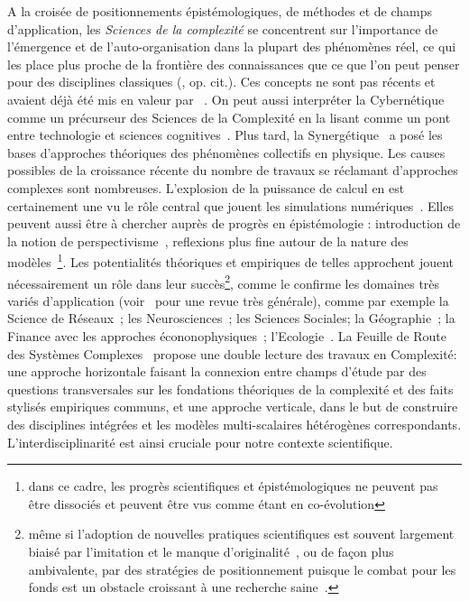 {}{
A la croisée de positionnements épistémologiques, de méthodes et de champs d'application, les \emph{Sciences de la complexité} se concentrent sur l'importance de l'émergence et de l'auto-organisation dans la plupart des phénomènes réel, ce qui les place plus proche de la frontière des connaissances que ce que l'on peut penser pour des disciplines classiques (, op. cit.). Ces concepts ne sont pas récents et avaient déjà été mis en valeur par ~\cite{anderson1972more}. On peut aussi interpréter la Cybernétique comme un précurseur des Sciences de la Complexité en la lisant comme un pont entre technologie et sciences cognitives~\cite{wiener1948cybernetics}.
 Plus tard, la Synergétique~\cite{haken1980synergetics} a posé les bases d'approches théoriques des phénomènes collectifs en physique. Les causes possibles de la croissance récente du nombre de travaux se réclamant d'approches complexes sont nombreuses. L'explosion de la puissance de calcul en est certainement une vu le rôle central que jouent les simulations numériques~\cite{varenne2010simulations}. Elles peuvent aussi être à chercher auprès de progrès en épistémologie : introduction de la notion de perspectivisme~\cite{giere2010scientific}, reflexions plus fine autour de la nature des modèles~\cite{varenne2013modeliser}\footnote{dans ce cadre, les progrès scientifiques et épistémologiques ne peuvent pas être dissociés et peuvent être vus comme étant en co-évolution}. Les potentialités théoriques et empiriques de telles approchent jouent nécessairement un rôle dans leur succès\footnote{même si l'adoption de nouvelles pratiques scientifiques est souvent largement biaisé par l'imitation et le manque d'originalité~\cite{dirk1999measure}, ou de façon plus ambivalente, par des stratégies de positionnement puisque le combat pour les fonds est un obstacle croissant à une recherche saine~\cite{bollen2014funding}.}, comme le confirme les domaines très variés d'application (voir~\cite{newman2011complex} pour une revue très générale), comme par exemple la Science de Réseaux~\cite{barabasi2002linked}; les Neurosciences~\cite{koch1999complexity}; les Sciences Sociales; la Géographie~\cite{manson2001simplifying}\cite{pumain1997pour}; la Finance avec les approches écononophysiques~\cite{stanley1999econophysics}; l'Ecologie~\cite{grimm2005pattern}. La Feuille de Route des Systèmes Complexes~\cite{2009arXiv0907.2221B} propose une double lecture des travaux en Complexité: une approche horizontale faisant la connexion entre champs d'étude par des questions transversales sur les fondations théoriques de la complexité et des faits stylisés empiriques communs, et une approche verticale, dans le but de construire des disciplines intégrées et les modèles multi-scalaires hétérogènes correspondants. L'interdisciplinarité est ainsi cruciale pour notre contexte scientifique.
}

